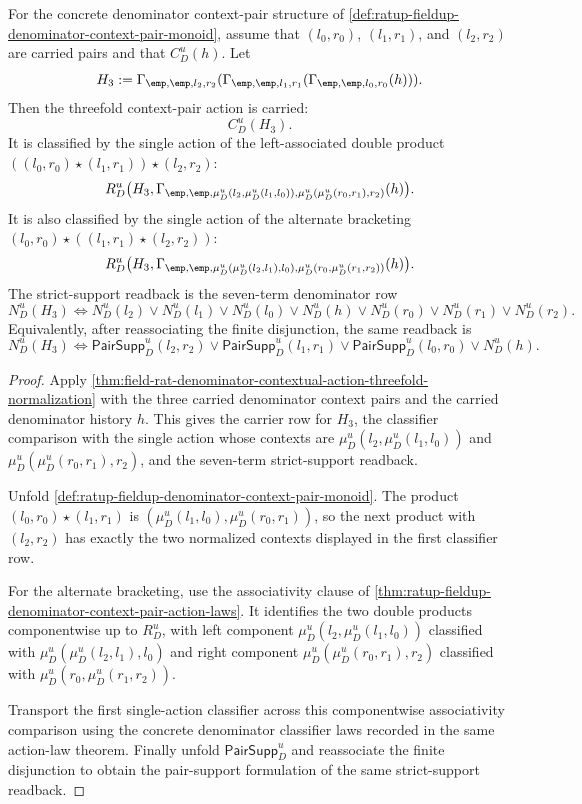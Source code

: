 \begin{theorem}
\label{thm:ratup-fieldup-denominator-context-pair-threefold-action-coherence}
For the concrete denominator context-pair structure of
\autoref{def:ratup-fieldup-denominator-context-pair-monoid}, assume that
$(l_0,r_0)$, $(l_1,r_1)$, and $(l_2,r_2)$ are carried pairs and that
$C_D^u(h)$. Let
$$
H_3:=
\Gamma_{\emp,\emp,l_2,r_2}
(\Gamma_{\emp,\emp,l_1,r_1}(\Gamma_{\emp,\emp,l_0,r_0}(h))).
$$
Then the threefold context-pair action is carried:
$$
C_D^u(H_3).
$$
It is classified by the single action of the left-associated double product
$( (l_0,r_0)\star(l_1,r_1))\star(l_2,r_2)$:
$$
R_D^u\bigl(H_3,
\Gamma_{\emp,\emp,\mu_D^u(l_2,\mu_D^u(l_1,l_0)),
\mu_D^u(\mu_D^u(r_0,r_1),r_2)}(h)\bigr).
$$
It is also classified by the single action of the alternate bracketing
$(l_0,r_0)\star((l_1,r_1)\star(l_2,r_2))$:
$$
R_D^u\bigl(H_3,
\Gamma_{\emp,\emp,\mu_D^u(\mu_D^u(l_2,l_1),l_0),
\mu_D^u(r_0,\mu_D^u(r_1,r_2))}(h)\bigr).
$$
The strict-support readback is the seven-term denominator row
$$
N_D^u(H_3)
\Longleftrightarrow
N_D^u(l_2)\lor N_D^u(l_1)\lor N_D^u(l_0)\lor N_D^u(h)
\lor N_D^u(r_0)\lor N_D^u(r_1)\lor N_D^u(r_2).
$$
Equivalently, after reassociating the finite disjunction, the same readback is
$$
N_D^u(H_3)
\Longleftrightarrow
\mathsf{PairSupp}_D^u(l_2,r_2)\lor
\mathsf{PairSupp}_D^u(l_1,r_1)\lor
\mathsf{PairSupp}_D^u(l_0,r_0)\lor N_D^u(h).
$$
\end{theorem}
\begin{proof}
Apply
\autoref{thm:field-rat-denominator-contextual-action-threefold-normalization}
with the three carried denominator context pairs and the carried denominator
history $h$. This gives the carrier row for $H_3$, the classifier comparison with
the single action whose contexts are
$\mu_D^u(l_2,\mu_D^u(l_1,l_0))$ and
$\mu_D^u(\mu_D^u(r_0,r_1),r_2)$, and the seven-term strict-support readback.

Unfold
\autoref{def:ratup-fieldup-denominator-context-pair-monoid}. The product
$(l_0,r_0)\star(l_1,r_1)$ is
$(\mu_D^u(l_1,l_0),\mu_D^u(r_0,r_1))$, so the next product with
$(l_2,r_2)$ has exactly the two normalized contexts displayed in the first
classifier row.

For the alternate bracketing, use the associativity clause of
\autoref{thm:ratup-fieldup-denominator-context-pair-action-laws}. It identifies
the two double products componentwise up to $R_D^u$, with left component
$\mu_D^u(l_2,\mu_D^u(l_1,l_0))$ classified with
$\mu_D^u(\mu_D^u(l_2,l_1),l_0)$ and right component
$\mu_D^u(\mu_D^u(r_0,r_1),r_2)$ classified with
$\mu_D^u(r_0,\mu_D^u(r_1,r_2))$.

Transport the first single-action classifier across this componentwise
associativity comparison using the concrete denominator classifier laws recorded
in the same action-law theorem. Finally unfold $\mathsf{PairSupp}_D^u$ and
reassociate the finite disjunction to obtain the pair-support formulation of the
same strict-support readback.
\end{proof}

